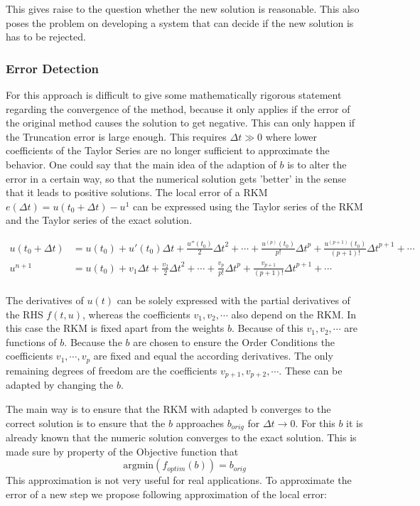 \documentclass[a4paper]{scrartcl}
\numberwithin{equation}{section}
\theoremstyle{plain}
\theoremstyle{definition}
\numberwithin{theorem}{section}
\newcommand{\dt}{{\Delta t}}
\newcommand{\1}{\mathbbm{1}}
\begin{document}
This gives raise to the question whether the new solution is reasonable.
This also poses the problem on developing a system that can decide if the new solution is has to be rejected. 
 
\subsubsection{Error Detection}
For this approach is difficult to give some mathematically rigorous statement regarding the convergence of the method, because it only applies if the error of the original method causes the solution to get negative. This can only happen if the Truncation error is large enough. This requires $\dt \gg 0$ where lower coefficients of the Taylor Series are no longer sufficient to approximate the behavior. 
One could say that the main idea of the adaption of $b$ is to alter the error in a certain way, so that the numerical solution gets 'better' in the sense that it leads to positive solutions. 
The local error of a RKM $e(\dt) =u(t_0 + \dt) - u^1$ can be expressed using the Taylor series of the RKM and the Taylor series of the exact solution. %

\begin{align}\label{eq:Taylor_sol_ref}
u(t_0 + \dt) &= u(t_0) + u'(t_0) \dt + \frac{u''(t_0)}{2} \dt^2 + \cdots + \frac{u^{(p)}(t_0)}{p!} \dt^p + \frac{u^{(p+1)}(t_0)}{(p+1)!} \dt^{p+1} + \cdots \\
u^{n+1} &= u(t_0)  + v_1 \dt + \frac{v_2}{2} \dt^2 + \cdots + \frac{v_p}{p!} \dt^p + \frac{v_{p+1}}{(p+1)!} \dt^{p+1} + \cdots \\
\end{align}

The derivatives of $u(t)$ can be solely expressed with the partial derivatives of the RHS $f(t,u)$, whereas the coefficients $v_1,v_2,\cdots$ also depend on the RKM. 
In this case the RKM is fixed apart from the weights $b$. 
Because of this $v_1,v_2,\cdots$ are functions of $b$.
Because the $b$ are chosen to ensure the Order Conditions the coefficients $v_1,\cdots,v_p$ are fixed and equal the according derivatives. 
The only remaining degrees of freedom are the coefficients $v_{p+1},v_{p+2},\cdots$.
These can be adapted by changing the $b$.

The main way is to ensure that the RKM with adapted b converges to the correct solution is to ensure that the $b$ approaches $b_{orig}$ for $\dt \to 0$. For this $b$ it is already known that the numeric solution converges to the exact solution.  
This is made sure by property of the Objective function that 
\begin{equation}
\mathrm{argmin}(f_{optim}(b)) = b_{orig}
\end{equation}
This approximation is not very useful for real applications. 
To approximate the error of a new step we propose following approximation of the local error:
\end{document}
